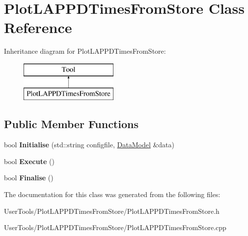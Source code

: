 \hypertarget{classPlotLAPPDTimesFromStore}{\section{Plot\-L\-A\-P\-P\-D\-Times\-From\-Store Class Reference}
\label{classPlotLAPPDTimesFromStore}
}
Inheritance diagram for Plot\-L\-A\-P\-P\-D\-Times\-From\-Store\-:\begin{figure}[H]
\begin{center}
\leavevmode
\includegraphics[height=2.000000cm]{classPlotLAPPDTimesFromStore}
\end{center}
\end{figure}
\subsection*{Public Member Functions}
\begin{DoxyCompactItemize}
\item 
\hypertarget{classPlotLAPPDTimesFromStore_a1c22a1c4414885d84bbc496082fc04d3}{bool {\bfseries Initialise} (std\-::string configfile, \hyperlink{classDataModel}{Data\-Model} \&data)}\label{classPlotLAPPDTimesFromStore_a1c22a1c4414885d84bbc496082fc04d3}

\item 
\hypertarget{classPlotLAPPDTimesFromStore_a785fe9ebe3ffe9c8d889eb25323b8ea4}{bool {\bfseries Execute} ()}\label{classPlotLAPPDTimesFromStore_a785fe9ebe3ffe9c8d889eb25323b8ea4}

\item 
\hypertarget{classPlotLAPPDTimesFromStore_a38ddf79485e6f76cf142c90243dcd119}{bool {\bfseries Finalise} ()}\label{classPlotLAPPDTimesFromStore_a38ddf79485e6f76cf142c90243dcd119}

\end{DoxyCompactItemize}


The documentation for this class was generated from the following files\-:\begin{DoxyCompactItemize}
\item 
User\-Tools/\-Plot\-L\-A\-P\-P\-D\-Times\-From\-Store/Plot\-L\-A\-P\-P\-D\-Times\-From\-Store.\-h\item 
User\-Tools/\-Plot\-L\-A\-P\-P\-D\-Times\-From\-Store/Plot\-L\-A\-P\-P\-D\-Times\-From\-Store.\-cpp\end{DoxyCompactItemize}
